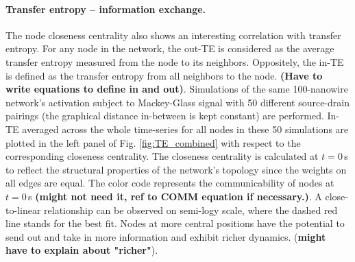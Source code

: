 \documentclass[fleqn,10pt,  reprint, amsmath,amssymb,aps, floatfix]{wlscirep}
\begin{document}


\paragraph{Transfer entropy -- information exchange.}
The node closeness centrality also shows an interesting correlation with transfer entropy. For any node in the network, the out-TE is considered as the average transfer entropy measured from the node to its neighbors. Oppositely, the in-TE is defined as the transfer entropy from all neighbors to the node. \textbf{(Have to write equations to define in and out)}. Simulations of the same 100-nanowire network's activation subject to Mackey-Glass signal with 50 different source-drain pairings (the graphical distance in-between is kept constant) are performed. In-TE averaged across the whole time-series for all nodes in these 50 simulations are plotted in the left panel of Fig. \ref{fig:TE_combined} with respect to the corresponding closeness centrality. The closeness centrality is calculated at $t = 0\,$s to reflect the structural properties of the network's topology since the weights on all edges are equal. The color code represents the communicability of nodes at $t = 0\,$s \textbf{(might not need it, ref to COMM equation if necessary.)}. A close-to-linear relationship can be observed on semi-logy scale, where the dashed red line stands for the best fit. Nodes at more central positions have the potential to send out and take in more information and exhibit richer dynamics. (\textbf{might have to explain about "richer"}).
\end{document}
